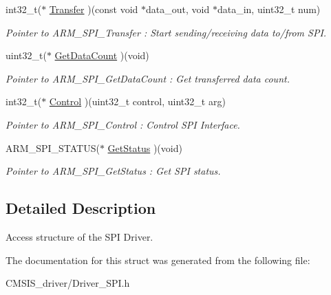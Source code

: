 \begin{DoxyCompactItemize}
\mbox{\label{struct___a_r_m___d_r_i_v_e_r___s_p_i_a777f1c8b5e51e4f524287e060a2d1f57}} 
int32\+\_\+t($\ast$ \mbox{\hyperlink{struct___a_r_m___d_r_i_v_e_r___s_p_i_a777f1c8b5e51e4f524287e060a2d1f57}{Transfer}} )(const void $\ast$data\+\_\+out, void $\ast$data\+\_\+in, uint32\+\_\+t num)
\begin{DoxyCompactList}\small\item\em Pointer to A\+R\+M\+\_\+\+S\+P\+I\+\_\+\+Transfer \+: Start sending/receiving data to/from S\+PI. \end{DoxyCompactList}\item 
\mbox{\label{struct___a_r_m___d_r_i_v_e_r___s_p_i_af638292f6b64604a4873594a1fec0e9d}} 
uint32\+\_\+t($\ast$ \mbox{\hyperlink{struct___a_r_m___d_r_i_v_e_r___s_p_i_af638292f6b64604a4873594a1fec0e9d}{Get\+Data\+Count}} )(void)
\begin{DoxyCompactList}\small\item\em Pointer to A\+R\+M\+\_\+\+S\+P\+I\+\_\+\+Get\+Data\+Count \+: Get transferred data count. \end{DoxyCompactList}\item 
\mbox{\label{struct___a_r_m___d_r_i_v_e_r___s_p_i_a5e96d73d3a3c366aba50bf5304edb029}} 
int32\+\_\+t($\ast$ \mbox{\hyperlink{struct___a_r_m___d_r_i_v_e_r___s_p_i_a5e96d73d3a3c366aba50bf5304edb029}{Control}} )(uint32\+\_\+t control, uint32\+\_\+t arg)
\begin{DoxyCompactList}\small\item\em Pointer to A\+R\+M\+\_\+\+S\+P\+I\+\_\+\+Control \+: Control S\+PI Interface. \end{DoxyCompactList}\item 
\mbox{\label{struct___a_r_m___d_r_i_v_e_r___s_p_i_aeac876fc25695e42dc475aeadb7f814e}} 
A\+R\+M\+\_\+\+S\+P\+I\+\_\+\+S\+T\+A\+T\+US($\ast$ \mbox{\hyperlink{struct___a_r_m___d_r_i_v_e_r___s_p_i_aeac876fc25695e42dc475aeadb7f814e}{Get\+Status}} )(void)
\begin{DoxyCompactList}\small\item\em Pointer to A\+R\+M\+\_\+\+S\+P\+I\+\_\+\+Get\+Status \+: Get S\+PI status. \end{DoxyCompactList}\end{DoxyCompactItemize}


\subsection{Detailed Description}
Access structure of the S\+PI Driver. 

The documentation for this struct was generated from the following file\+:\begin{DoxyCompactItemize}
\item 
C\+M\+S\+I\+S\+\_\+driver/Driver\+\_\+\+S\+P\+I.\+h\end{DoxyCompactItemize}
